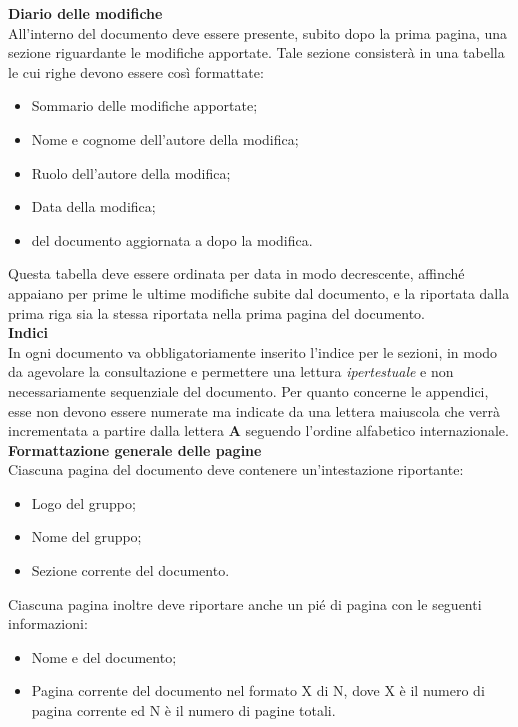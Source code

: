   \textbf{Diario delle modifiche} \\
  All'interno del documento deve essere presente, subito dopo la prima pagina, una sezione riguardante le modifiche apportate. Tale sezione consisterà in una tabella le cui righe devono essere cos\`i formattate:
  \begin{itemize}
  \item Sommario delle modifiche apportate;
  \item Nome e cognome dell'autore della modifica;
  \item Ruolo dell'autore della modifica;
  \item Data della modifica;
  \item {} del documento aggiornata a dopo la modifica.
  \end{itemize}
  Questa tabella deve essere ordinata per data in modo decrescente, affinché appaiano per prime le ultime modifiche subite dal documento, e la  riportata dalla prima riga sia la stessa riportata nella prima pagina del documento. \\

  \textbf{Indici} \\
  In ogni documento va obbligatoriamente inserito l'indice per le sezioni, in modo da agevolare la consultazione e permettere una lettura \textit{ipertestuale} 
  e non necessariamente sequenziale del documento.
  Per quanto concerne le appendici, esse non devono essere numerate ma indicate da una lettera maiuscola che verrà
  incrementata a partire dalla lettera \textbf{A} seguendo l’ordine alfabetico internazionale. \\
  
  \textbf{Formattazione generale delle pagine}  \\
  Ciascuna pagina del documento deve contenere un'intestazione riportante:
  \begin{itemize}
  \item Logo del gruppo;
  \item Nome del gruppo;
  \item Sezione corrente del documento.
  \end{itemize}
  Ciascuna pagina inoltre deve riportare anche un pié di pagina con le seguenti informazioni:
  \begin{itemize}
  \item Nome e  del documento;
  \item Pagina corrente del documento nel formato X di N, dove X è il numero di pagina corrente ed N è il numero di pagine totali.
  \end{itemize}
  
